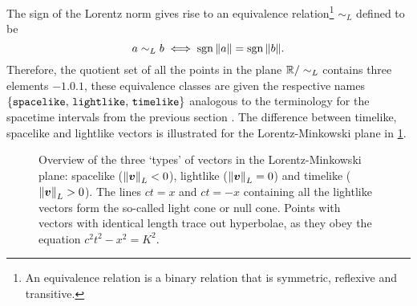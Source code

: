 The sign of the Lorentz norm gives rise to an equivalence relation\footnote{An equivalence relation is a binary relation that is symmetric, reflexive and transitive.}  \(\sim_L\) defined to be 
$$a \sim_L b \iff \operatorname{sgn}{\norm{a}} = \operatorname{sgn}{\norm{b}}.$$
Therefore, the quotient set of all the points in the plane \(\mathbb{R} / \sim_L \) contains three elements \(\qty{-1, 0, 1}\), these equivalence classes are given the respective names \(\qty{\text{\texttt{spacelike}},\, \text{\texttt{lightlike}},\, \text{\texttt{timelike}}}\) analogous to the terminology for the spacetime intervals from the previous section \cite{Landau1971}. The difference between timelike, spacelike and lightlike vectors is illustrated for the Lorentz-Minkowski plane in \cref{fig:lightlike_spacelike}.

\begin{figure}[ht]
    \centering
    
    \caption{Overview of the three `types' of vectors in the Lorentz-Minkowski plane: spacelike (\(\norm{\vb*{v}}_L < 0\)), lightlike (\(\norm{\vb*{v}}_L = 0\)) and timelike (\(\norm{\vb*{v}}_L > 0\)). The lines \(ct = x\) and \(ct = -x\) containing all the lightlike vectors form the so-called light cone or null cone. Points with vectors with identical length trace out hyperbolae, as they obey the equation $c^2t^2 - x^2 = K^2$.} %
    \label{fig:lightlike_spacelike}
\end{figure}


